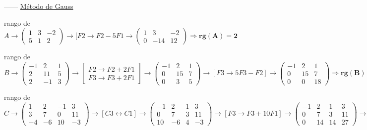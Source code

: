 \begin{proofw}\renewcommand{\qedsymbol}{$\diamond$}


------ \underline{Método de Gauss}
	
\noindent  * rango de $A \to   \left( \begin{matrix} 1&3&-2\\5&1&2  \end{matrix} \right) \to  [F2\to F2-5F1 \to \left( \begin{matrix} 1&3&-2\\0&-14&12  \end{matrix} \right) \Rightarrow \boldsymbol{rg(A)=2}$

\noindent  * rango de $B \to \left( \begin{matrix} -1&2&1\\2&11&5\\2&-1&3  \end{matrix} \right)  \to \left[ \begin{matrix}  F2\to F2+2F1 \\ F3\to F3+2F1 \end{matrix} \right] \to \left( \begin{matrix} -1&2&1\\0&15&7\\0&3&5  \end{matrix} \right)  \to [F3 \to 5F3-F2] \to \left( \begin{matrix} -1&2&1\\0&15&7\\0&0&18  \end{matrix} \right) \Rightarrow \boldsymbol{rg(B)=3}$

\noindent  * rango de $C \to \left( \begin{matrix}  1&2&-1&3\\3&7&0&11\\-4&-6&10&-3 \end{matrix} \right) \to   [C3 \leftrightarrow C1 ] \to \left( \begin{matrix}  -1&2&1&3\\0&7&3&11\\10&-6&4&-3 \end{matrix} \right) \to [F3 \to F3+10F1]\to \left( \begin{matrix}  -1&2&1&3\\0&7&3&11\\0&14&14&27 \end{matrix} \right) \to [F3 \to F3-2F2] \to \left( \begin{matrix}  -1&2&1&3\\0&7&3&11\\0&0&8&5 \end{matrix} \right) \Rightarrow \boldsymbol{rg(C)=3}$


\end{proofw}
